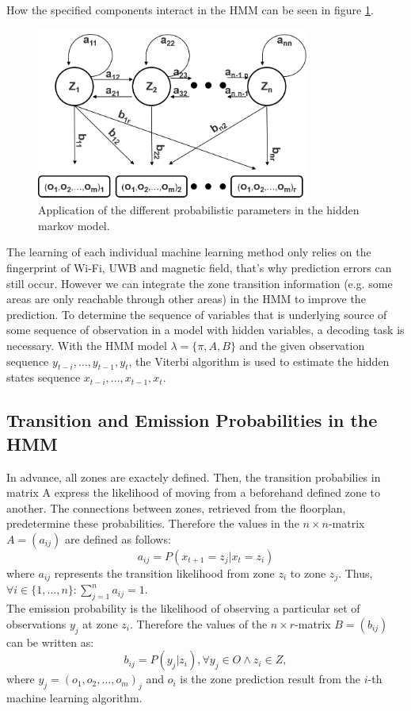 How the specified components interact in the HMM can be seen in figure \ref{fig:hidden_markov_model}.


\begin{figure}[th]
\centering
\includegraphics[width=0.8\textwidth]{Figures/hidden_markov_model}
\decoRule
\caption[HMM]{Application of the different probabilistic parameters in the hidden markov model.}
\label{fig:hidden_markov_model}
\end{figure}

The learning of each individual machine learning method only relies on the fingerprint of Wi-Fi, UWB and magnetic field, that's why prediction errors can still occur. However we can integrate the zone transition information (e.g. some areas are only reachable through other areas) in the HMM to improve the prediction. To determine the sequence of variables that is underlying source of some sequence of observation in a model with hidden variables, a decoding task is necessary. With the HMM model $\lambda = \{\pi, A, B\}$ and the given observation sequence $y_{t-i},\dots, y_{t-1},y_{t}$, the Viterbi algorithm \cite{Viterbi} is used to estimate the hidden states sequence $x_{t-i},\dots,x_{t-1},x_{t}$.

\subsection{Transition and Emission Probabilities in the HMM}
In advance, all zones are exactely defined. Then, the transition probabilies in matrix A express the likelihood of moving from a beforehand defined zone to another. The connections between zones, retrieved from the floorplan, predetermine these probabilities. Therefore the values in the $n\times n$-matrix $A = (a_{ij})$ are defined as follows:
$$a_{ij} = P(x_{t+1} = z_{j} | x_{t} = z_{i})$$
where $a_{ij}$ represents the transition likelihood from zone $z_{i}$ to zone $z_{j}$. Thus, $\forall i \in \{1,\dots,n\}: \sum_{j=1}^{n} a_{ij} = 1$.\\
The emission probability is the likelihood of observing a particular set of observations $y_{j}$ at zone $z_{i}$. Therefore the values of the $n\times r$-matrix $B = (b_{ij})$ can be written as:
$$b_{ij} = P(y_{j} | z_{i}), \forall y_{j} \in O \land z_{i} \in Z,$$
where $y_{j} = (o_1, o_2, \dots, o_m)_j$ and $o_i$ is the zone prediction result from the $i$-th machine learning algorithm.

